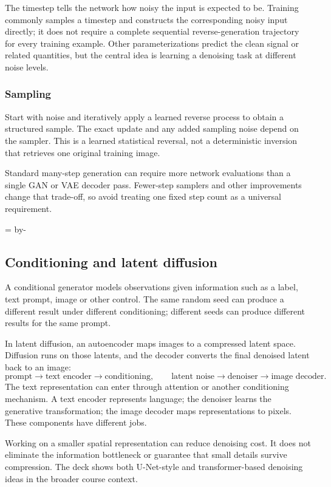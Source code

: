 \documentclass[11pt]{article}
\newcommand{\newsubsection}[1]{\par\begingroup\skip0=\pagegoal\advance\skip0 by-\pagetotal\ifdim\skip0<12\baselineskip\newpage\fi\endgroup\subsection{#1}}
\begin{document}
The timestep tells the network how noisy the input is expected to be. Training commonly samples a timestep and constructs the corresponding noisy input directly; it does not require a complete sequential reverse-generation trajectory for every training example. Other parameterizations predict the clean signal or related quantities, but the central idea is learning a denoising task at different noise levels.

\subsubsection{Sampling}
Start with noise and iteratively apply a learned reverse process to obtain a structured sample. The exact update and any added sampling noise depend on the sampler. This is a learned statistical reversal, not a deterministic inversion that retrieves one original training image.

Standard many-step generation can require more network evaluations than a single GAN or VAE decoder pass. Fewer-step samplers and other improvements change that trade-off, so avoid treating one fixed step count as a universal requirement.

\newsubsection{Conditioning and latent diffusion}
A conditional generator models observations given information such as a label, text prompt, image or other control. The same random seed can produce a different result under different conditioning; different seeds can produce different results for the same prompt.

In latent diffusion, an autoencoder maps images to a compressed latent space. Diffusion runs on those latents, and the decoder converts the final denoised latent back to an image:
\[
\text{prompt}\to\text{text encoder}\to\text{conditioning},\qquad
\text{latent noise}\to\text{denoiser}\to\text{image decoder}.
\]
The text representation can enter through attention or another conditioning mechanism. A text encoder represents language; the denoiser learns the generative transformation; the image decoder maps representations to pixels. These components have different jobs.

Working on a smaller spatial representation can reduce denoising cost. It does not eliminate the information bottleneck or guarantee that small details survive compression. The deck shows both U-Net-style and transformer-based denoising ideas in the broader course context.
\end{document}
